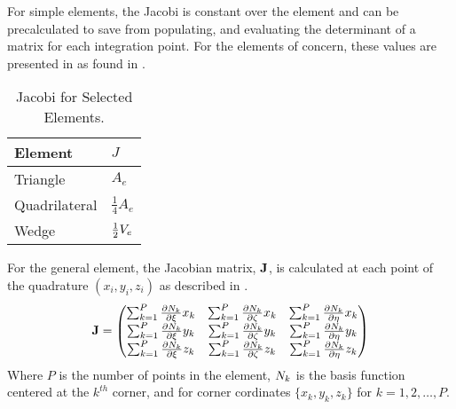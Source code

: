     For simple elements, the Jacobi is constant over the element and can be
    precalculated to save from populating, and evaluating the 
    determinant of a matrix for each integration point. For the elements of 
    concern, these values are presented in  as found in 
    \cite{textbookcolorado}.
    \begin{table}
      \caption{Jacobi for Selected Elements.}
      \label{tab:jacobi}
      \begin{center}
        \begin{tabular}{ll}
          \toprule
          Element & $J$ \\
          \midrule
          Triangle      & $A_e$ \\
          Quadrilateral & $\frac{1}{4} A_e$ \\
          Wedge         & $\frac{1}{2} V_e$ \\
          \bottomrule
        \end{tabular}
      \end{center}
    \end{table}

    For the general element, the Jacobian matrix, $\mathbf{J}$, is calculated at each
    point of the quadrature $(x_i,y_i,z_i)$ as described in
    .
    \begin{equation}
      \label{eq:calcJacobian}
      \mathbf{J} = 
      \begin{pmatrix}
        \sum_{k=1}^P \frac{\partial N_k}{\partial \xi} x_k   &
        \sum_{k=1}^P \frac{\partial N_k}{\partial \zeta} x_k &
        \sum_{k=1}^P \frac{\partial N_k}{\partial \eta} x_k   \\
        \sum_{k=1}^P \frac{\partial N_k}{\partial \xi} y_k   &
        \sum_{k=1}^P \frac{\partial N_k}{\partial \zeta} y_k &
        \sum_{k=1}^P \frac{\partial N_k}{\partial \eta} y_k   \\
        \sum_{k=1}^P \frac{\partial N_k}{\partial \xi} z_k   &
        \sum_{k=1}^P \frac{\partial N_k}{\partial \zeta} z_k &
        \sum_{k=1}^P \frac{\partial N_k}{\partial \eta} z_k   \\
      \end{pmatrix}
    \end{equation}
    Where $P$ is the number of points in the element, $N_k$ is the basis
    function centered at the $k^{th}$ corner, and for corner cordinates 
    $\{x_k,y_k,z_k\}$ for $k = 1,2,\ldots,P$.

